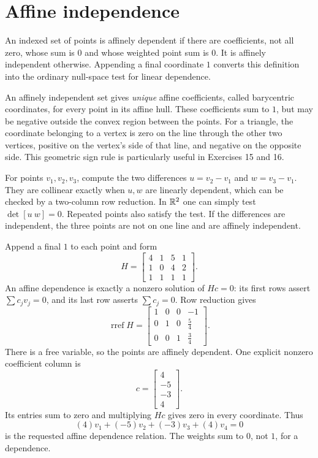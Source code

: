 \section{Affine independence}
An indexed set of points is affinely dependent if there are coefficients, not all zero, whose sum is $0$ and whose weighted point sum is $0$. It is affinely independent otherwise. Appending a final coordinate $1$ converts this definition into the ordinary null-space test for linear dependence.

An affinely independent set gives \emph{unique} affine coefficients, called barycentric coordinates, for every point in its affine hull. These coefficients sum to $1$, but may be negative outside the convex region between the points. For a triangle, the coordinate belonging to a vertex is zero on the line through the other two vertices, positive on the vertex's side of that line, and negative on the opposite side. This geometric sign rule is particularly useful in Exercises 15 and 16.

For points $v_1,v_2,v_3$, compute the two differences $u=v_2-v_1$ and $w=v_3-v_1$. They are collinear exactly when $u,w$ are linearly dependent, which can be checked by a two-column row reduction. In $\mathbb{R}^2$ one can simply test $\det[u\ w]=0$. Repeated points also satisfy the test. If the differences are independent, the three points are not on one line and are affinely independent.

Append a final $1$ to each point and form
\[H=\begin{bmatrix}4&1&5&1\\1&0&4&2\\1&1&1&1\end{bmatrix}.\]
An affine dependence is exactly a nonzero solution of $Hc=0$: its first rows assert $\sum c_jv_j=0$, and its last row asserts $\sum c_j=0$. Row reduction gives
\[\operatorname{rref}H=\begin{bmatrix}1&0&0&-1\\0&1&0&\frac{5}{4}\\0&0&1&\frac{3}{4}\end{bmatrix}.\]
There is a free variable, so the points are affinely dependent. One explicit nonzero coefficient column is
\[c=\begin{bmatrix}4\\-5\\-3\\4\end{bmatrix}.\]
Its entries sum to zero and multiplying $Hc$ gives zero in every coordinate. Thus
\[(4)v_1 + (-5)v_2 + (-3)v_3 + (4)v_4=0\]
is the requested affine dependence relation. The weights sum to $0$, not $1$, for a dependence.

